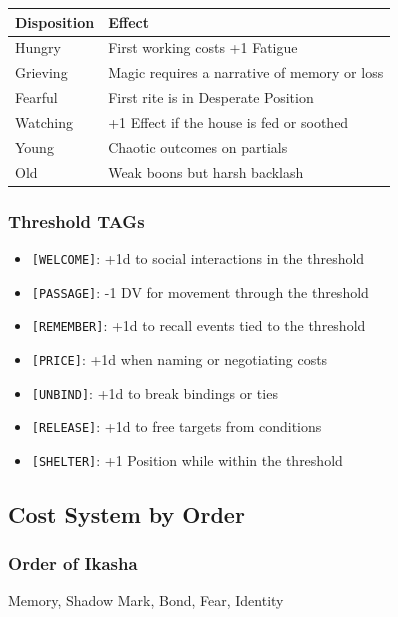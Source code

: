 \documentclass[11pt]{book}
\begin{document}
\begin{center}
\begin{longtable}{p{} p{}}
\toprule
\textbf{Disposition} & \textbf{Effect} \\
\midrule
Hungry   & First working costs +1 Fatigue \\
Grieving & Magic requires a narrative of memory or loss \\
Fearful  & First rite is in Desperate Position \\
Watching & +1 Effect if the house is fed or soothed \\
Young    & Chaotic outcomes on partials \\
Old      & Weak boons but harsh backlash \\
\bottomrule
\end{longtable}
\end{center}

\subsubsection*{Threshold TAGs}

\begin{itemize}[noitemsep]
    \item \texttt{[WELCOME]}: +1d to social interactions in the threshold
    \item \texttt{[PASSAGE]}: -1 DV for movement through the threshold
    \item \texttt{[REMEMBER]}: +1d to recall events tied to the threshold
    \item \texttt{[PRICE]}: +1d when naming or negotiating costs
    \item \texttt{[UNBIND]}: +1d to break bindings or ties
    \item \texttt{[RELEASE]}: +1d to free targets from conditions
    \item \texttt{[SHELTER]}: +1 Position while within the threshold
\end{itemize}

\subsection*{Cost System by Order}

\subsubsection*{Order of Ikasha}
Memory, Shadow Mark, Bond, Fear, Identity
\end{document}

